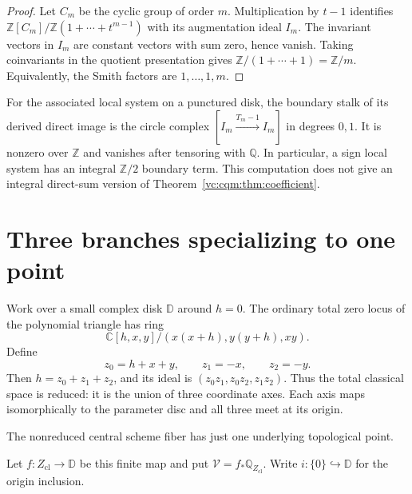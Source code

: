 \begin{proof}
Let $C_m$ be the cyclic group of order $m$.
Multiplication by $t-1$ identifies
$\mathbb Z[C_m]/\mathbb Z(1+\cdots+t^{m-1})$ with
its augmentation ideal $I_m$.
The invariant vectors in $I_m$ are constant vectors
with sum zero, hence vanish. Taking coinvariants in
the quotient presentation gives
$\mathbb Z/(1+\cdots+1)=\mathbb Z/m$.
Equivalently, the Smith factors are
$1,\ldots,1,m$.
\end{proof}

For the associated local system on a punctured disk,
the boundary stalk of its derived direct image is the
circle complex $[I_m\xrightarrow{T_m-1}I_m]$ in
degrees $0,1$. It is nonzero over $\mathbb Z$ and
vanishes after tensoring with $\mathbb Q$.
In particular, a sign local system has an integral
$\mathbb Z/2$ boundary term. This computation does not
give an integral direct-sum version of
Theorem~\ref{vc:cqm:thm:coefficient}.
\section{Three branches specializing to one point}

Work over a small complex disk $\mathbb D$ around $h=0$.
The ordinary total zero locus of the polynomial triangle
has ring
\begin{equation}\label{vc:vic:eq:three-branch-ring}
 \mathbb C[h,x,y]/(x(x+h),y(y+h),xy).
\end{equation}
Define
\[
 z_0=h+x+y,\qquad z_1=-x,\qquad z_2=-y.
\]
Then $h=z_0+z_1+z_2$, and its ideal is
$(z_0z_1,z_0z_2,z_1z_2)$.
Thus the total classical space is reduced: it is the union
of three coordinate axes. Each axis maps isomorphically to
the parameter disc and all three meet at its origin.

The nonreduced central scheme fiber has just one underlying
topological point.

Let $f:Z_{\mathrm{cl}}\to\mathbb D$ be this finite map and put
$\mathcal V=f_*\mathbb Q_{Z_{\mathrm{cl}}}$.
Write $i:\{0\}\hookrightarrow\mathbb D$ for the origin inclusion.

